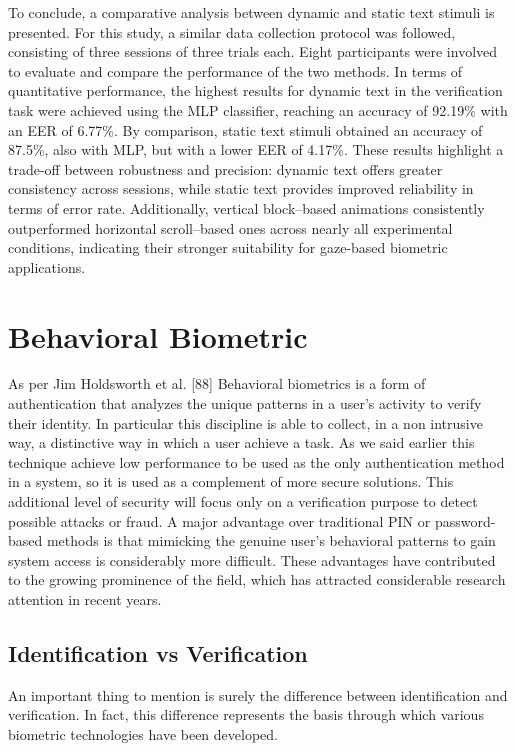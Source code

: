 \documentclass[12pt]{report}
\begin{document}
To conclude, a comparative analysis between dynamic and static text stimuli is presented.
For this study, a similar data collection protocol was followed, consisting of three sessions of three trials each.
Eight participants were involved to evaluate and compare the performance of the two methods.
In terms of quantitative performance, the highest results for dynamic text in the verification task were achieved using the MLP classifier, reaching an accuracy of 92.19\% with an EER of 6.77\%.
By comparison, static text stimuli obtained an accuracy of 87.5\%, also with MLP, but with a lower EER of 4.17\%.
These results highlight a trade-off between robustness and precision: dynamic text offers greater consistency across sessions, while static text provides improved reliability in terms of error rate.
Additionally, vertical block–based animations consistently outperformed horizontal scroll–based ones across nearly all experimental conditions, indicating their stronger suitability for gaze-based biometric applications.

\newpage

\chapter{Behavioral Biometric}

\noindent
As per Jim Holdsworth et al. [88] Behavioral biometrics is a form of authentication that analyzes the unique patterns in a user's activity to verify their identity. 
In particular this discipline is able to collect, in a non intrusive way, a distinctive way in which a user achieve a task.
As we said earlier this technique achieve low performance to be used as the only authentication method in a system, so it is used as a complement of more secure solutions.
This additional level of security will focus only on a verification purpose to detect possible attacks or fraud.
A major advantage over traditional PIN or password-based methods is that mimicking the genuine user's behavioral patterns to gain system access is considerably more difficult.
These advantages have contributed to the growing prominence of the field, which has attracted considerable research attention in recent years.

\section{Identification vs Verification}

An important thing to mention is surely the difference between identification and verification.
In fact, this difference represents the basis through which various biometric technologies have been developed.
\end{document}
